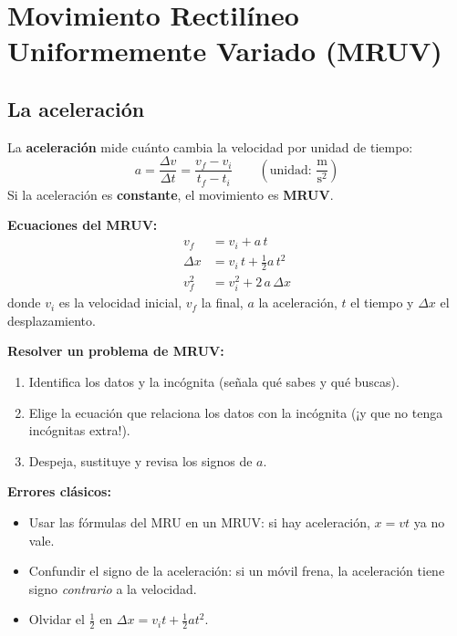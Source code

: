 \documentclass[12pt, letterpaper]{article}
\begin{document}
\section{Movimiento Rectilíneo Uniformemente Variado (MRUV)}

\subsection{La aceleración}

\begin{cuadroteoria}
  La \textbf{aceleración} mide cuánto cambia la velocidad por unidad de tiempo:
  $$a = \frac{\Delta v}{\Delta t} = \frac{v_f - v_i}{t_f - t_i} \qquad \left(\text{unidad: } \frac{\text{m}}{\text{s}^2}\right)$$
  Si la aceleración es \textbf{constante}, el movimiento es \textbf{MRUV}.
\end{cuadroteoria}

\begin{cuadroteoria}
  \textbf{Ecuaciones del MRUV:}
  \begin{align*}
    v_f      & = v_i + a\, t                    \\
    \Delta x & = v_i\, t + \tfrac{1}{2} a\, t^2 \\
    v_f^2    & = v_i^2 + 2\, a\, \Delta x
  \end{align*}
  donde $v_i$ es la velocidad inicial, $v_f$ la final, $a$ la aceleración, $t$ el tiempo y $\Delta x$ el desplazamiento.
\end{cuadroteoria}

\begin{cuadropasos}
  \textbf{Resolver un problema de MRUV:}
  \begin{enumerate}[leftmargin=*]
    \item Identifica los datos y la incógnita (señala qué sabes y qué buscas).
    \item Elige la ecuación que relaciona los datos con la incógnita (¡y que no tenga incógnitas extra!).
    \item Despeja, sustituye y revisa los signos de $a$.
  \end{enumerate}
\end{cuadropasos}

\begin{cuadroadvertencia}
  \textbf{Errores clásicos:}
  \begin{itemize}[leftmargin=*]
    \item Usar las fórmulas del MRU en un MRUV: si hay aceleración, $x = v t$ ya no vale.
    \item Confundir el signo de la aceleración: si un móvil frena, la aceleración tiene signo \emph{contrario} a la velocidad.
    \item Olvidar el $\frac{1}{2}$ en $\Delta x = v_i t + \frac{1}{2} a t^2$.
  \end{itemize}
\end{cuadroadvertencia}
\end{document}
